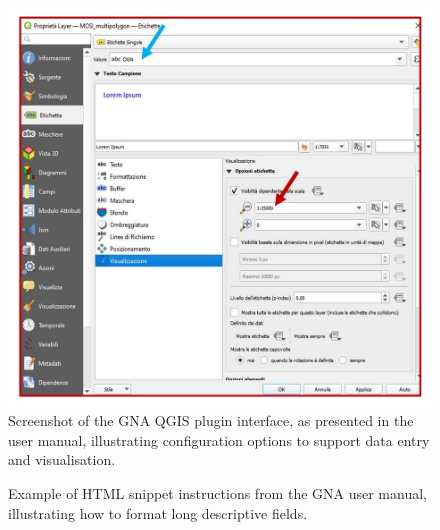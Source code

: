 \begin{spacing}{1.5}
\begin{figure}[H]
  \centering
  \includegraphics[width=\textwidth]{images/esempio_screen.png} 
  \caption{Screenshot of the GNA QGIS plugin interface, as presented in the user manual, illustrating configuration options to support data entry and visualisation.}
  \label{fig:screen_image}
\end{figure}

\begin{figure}[H]
  \centering
  \caption{Example of HTML snippet instructions from the GNA user manual, illustrating how to format long descriptive fields.}
  \label{fig:html_example}
\end{figure}


\end{spacing}
